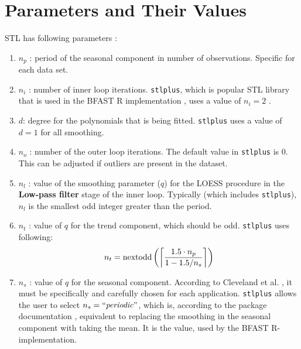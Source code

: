 \documentclass[main.tex]{subfiles}
\begin{document}
\section{Parameters and Their Values}
\label{sec:parameter_values}
STL has following parameters \cite{stl}:
\begin{enumerate}
\item $n_p$ : period of the seasonal component in number of observations.
  Specific for each data set.
\item $n_i$ : number of inner loop iterations. \texttt{stlplus}, which is
  popular STL library that is used in the BFAST R implementation \cite{bfast-github}, uses a
  value of $n_i = 2$ \cite{stlplus}.
\item $d$: degree for the polynomials that is being fitted.
  \texttt{stlplus} uses a value of $d=1$ for all smoothing.
\item $n_o$ : number of the outer loop iterations. The default value in
  \texttt{stlplus} is 0. This can be adjusted if outliers are present in the dataset.
\item $n_l$ : value of the smoothing parameter ($q$) for the LOESS procedure in the
  \textbf{Low-pass filter} stage of the inner loop. Typically (which includes
  \texttt{stlplus}), $n_l$ is the smallest odd integer greater than the period.
\item $n_t$ : value of $q$ for the trend component, which should be odd.
  \texttt{stlplus} uses following:
  \[
  n_t =\text{nextodd}\left(
  \ceil[\bigg]{
    \frac{1.5 \cdot n_p}
         {1-1.5/n_s}
  }
  \right)
  \]
\item $n_s$ : value of $q$ for the seasonal component. According to Cleveland
  et al. \cite{stl}, it must be specifically and
  carefully chosen for each application. \texttt{stlplus} allows
  the user to select $n_s = \text{``\emph{periodic}''}$, which is, according to
  the package documentation \cite{stlplus}, equivalent to replacing
  the smoothing in the seasonal component with taking the mean. It is the value,
  used by the BFAST R-implementation.
\end{enumerate}
\biblio
\end{document}
